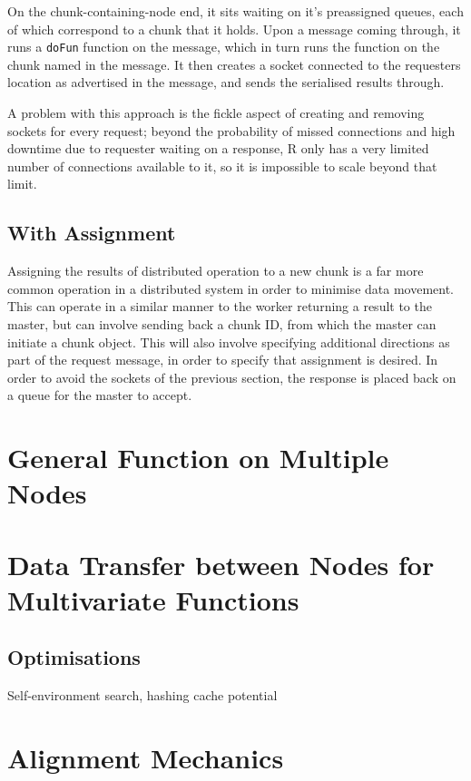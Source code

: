 \documentclass[a4paper,10pt]{article}
\begin{document}
On the chunk-containing-node end, it sits waiting on it's preassigned queues,
each of which correspond to a chunk that it holds. Upon a message coming
through, it runs a \texttt{doFun} function on the message, which in turn runs
the function on the chunk named in the message. 
It then creates a socket connected to the requesters location as advertised in
the message, and sends the serialised results through.





A problem with this approach is the fickle aspect of creating and removing
sockets for every request; beyond the probability of missed connections and
high downtime due to requester waiting on a response, R only has a very limited
number of connections available to it, so it is impossible to scale beyond that
limit.

\subsection{With Assignment}

Assigning the results of distributed operation to a new chunk is a far more
common operation in a distributed system in order to minimise data movement.
This can operate in a similar manner to the worker returning a result to the
master, but can involve sending back a chunk ID, from which the master can
initiate a chunk object.
This will also involve specifying additional directions as part of the request
message, in order to specify that assignment is desired.
In order to avoid the sockets of the previous section, the response is placed
back on a queue for the master to accept.

\section{General Function on Multiple Nodes}
\section{Data Transfer between Nodes for Multivariate Functions}
\subsection{Optimisations}
Self-environment search, hashing cache potential
\section{Alignment Mechanics}
\end{document}
